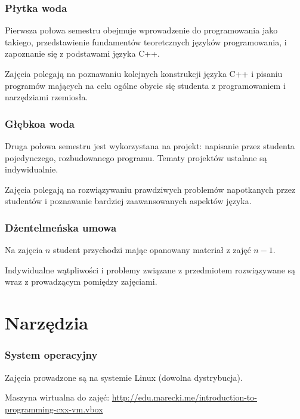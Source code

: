 \documentclass[aspectratio=169]{beamer}
\begin{document}
\begin{frame}
    \frametitle{Płytka woda}

    Pierwsza połowa semestru obejmuje wprowadzenie do programowania jako
    takiego, przedstawienie fundamentów teoretcznych języków programowania, i
    zapoznanie się z podstawami języka C++.

    \vspace{1em}

    Zajęcia polegają na poznawaniu kolejnych konstrukcji języka C++ i pisaniu
    programów mających na celu ogólne obycie się studenta z programowaniem i
    narzędziami rzemiosła.
\end{frame}

\begin{frame}
    \frametitle{Głębkoa woda}

    Druga połowa semestru jest wykorzystana na projekt: napisanie przez studenta
    pojedynczego, rozbudowanego programu. Tematy projektów ustalane są
    indywidualnie.

    \vspace{1em}

    Zajęcia polegają na rozwiązywaniu prawdziwych problemów napotkanych przez
    studentów i poznawanie bardziej zaawansowanych aspektów języka.
\end{frame}

\begin{frame}
    \frametitle{Dżentelmeńska umowa}

    Na zajęcia $n$ student przychodzi mając opanowany materiał z zajęć $n-1$.

    \vspace{1em}

    Indywidualne wątpliwości i problemy związane z przedmiotem rozwiązywane są
    wraz z prowadzącym pomiędzy zajęciami.
\end{frame}

\section{Narzędzia}

\begin{frame}
    \frametitle{System operacyjny}

    Zajęcia prowadzone są na systemie Linux (dowolna dystrybucja).

    {\tiny Maszyna wirtualna do zajęć:
    \url{http://edu.marecki.me/introduction-to-programming-cxx-vm.vbox}}
\end{frame}
\end{document}
